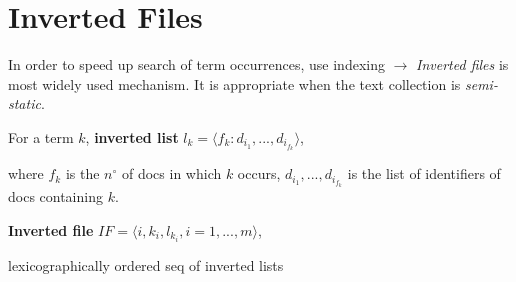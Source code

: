 \section{Inverted Files}
In order to speed up search of term occurrences, use indexing $\rightarrow$ \emph{Inverted files} is most widely used mechanism. It is appropriate when the text collection is \emph{semi-static}.

For a term $k$, \textbf{inverted list} $l_k = \langle f_k : d_{i_1}, ..., d_{i_{f_k}} \rangle$,

where $f_k$ is the $n^\circ$ of docs in which $k$ occurs, $d_{i_1}, ..., d_{i_{f_k}}$ is the list of identifiers of docs containing $k$.

\textbf{Inverted file} $IF = \langle i, k_i, l_{k_i}, i = 1,..., m \rangle$,

lexicographically ordered seq of inverted lists
